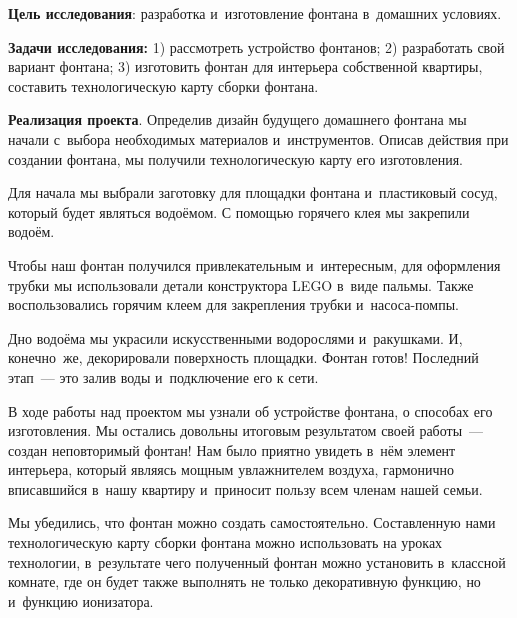 


\makeProcTitleSchool


\textbf{Цель исследования}: разработка и~изготовление фонтана в~домашних условиях.

\textbf{Задачи исследования:} 1) рассмотреть устройство фонтанов; 2) разработать свой вариант фонтана; 3) изготовить фонтан для интерьера собственной квартиры, составить технологическую карту сборки фонтана.

\textbf{Реализация проекта}. Определив дизайн будущего домашнего фонтана мы начали с~выбора необходимых материалов и~инструментов. Описав действия при создании фонтана, мы получили технологическую карту его изготовления.

Для начала мы выбрали заготовку для площадки фонтана и~пластиковый сосуд, который будет являться водоёмом. С помощью горячего клея мы закрепили водоём.

Чтобы наш фонтан получился привлекательным и~интересным, для оформления трубки мы использовали детали конструктора LEGO в~виде пальмы. Также воспользовались горячим клеем для закрепления трубки и~насоса-помпы.

Дно водоёма мы украсили искусственными водорослями и~ракушками. И, конечно~же, декорировали поверхность площадки.
Фонтан готов! Последний этап~--- это залив воды и~подключение его к сети.

В ходе работы над проектом мы узнали об устройстве фонтана, о способах его изготовления. Мы остались довольны итоговым результатом своей работы~--- создан неповторимый фонтан! Нам было приятно увидеть в~нём элемент интерьера, который являясь мощным увлажнителем воздуха, гармонично вписавшийся в~нашу квартиру и~приносит пользу всем членам нашей семьи.

Мы убедились, что фонтан можно создать самостоятельно. Составленную нами технологическую карту сборки фонтана можно использовать на уроках технологии, в~результате чего полученный фонтан можно установить в~классной комнате, где он будет также выполнять не только декоративную функцию, но и~функцию ионизатора.

